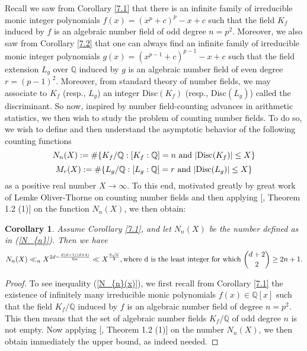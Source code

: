 \documentclass{article}
\theoremstyle{plain}
\newtheorem{cor}[thm]{Corollary}
\theoremstyle{definition}
\begin{document}
Recall we saw from Corollary \ref{7.1} that there is an infinite family of irreducible monic integer polynomials $f(x) = (x^p+c)^p-x+c$ such that the field $K_{f}$ induced by $f$ is an algebraic number field of odd degree $n=p^2$. Moreover, we also saw from Corollary \ref{7.2} that one can always find an infinite family of irreducible monic integer polynomials $g(x) = (x^{p-1}+c)^{p-1}-x+c$ such that the field extension $L_{g}$ over $\mathbb{Q}$ induced by $g$ is an algebraic number field of even degree $r=(p-1)^2$. Moreover, from standard theory of number fields, we may associate to $K_{f}$ (resp., $L_{g}$) an integer Disc$(K_{f})$ (resp., Disc$(L_{g})$) called the discriminant. So now, inspired by number field-counting advances in arithmetic statistics, we then wish to study the problem of counting number fields. To do so, we wish to define and then understand the asymptotic behavior of the following counting functions  
\begin{equation}\label{N_{n}}
N_{n}(X) := \# \{K_{f}\slash \mathbb{Q} : [K_{f} : \mathbb{Q}] = n \textnormal{ and } |\text{Disc}(K_{f})|\leq X \}
\end{equation} 
\begin{equation}\label{M_{r}}
M_{r}(X) := \# \{L_{g}\slash \mathbb{Q} : [L_{g} : \mathbb{Q}] = r \textnormal{ and} \ |\text{Disc}(L_{g})|\leq X \}
\end{equation} as a positive real number $X\to \infty$. To this end, motivated greatly by great work of Lemke Oliver-Thorne \cite{lem} on counting number fields and then applying [\cite{lem}, Theorem 1.2 (1)] on the function $N_{n}(X)$, we then obtain:

\begin{cor} \label{8.1} Assume Corollary \ref{7.1}, and let $N_{n}(X)$ be the number defined as in \textnormal{(\ref{N_{n}})}. Then we have 
\begin{equation}\label{N_{n}(x)} 
N_{n}(X)\ll_{n}X^{2d - \frac{d(d-1)(d+4)}{6n}}\ll X^{\frac{8\sqrt{n}}{3}}, \text{where d is the least integer for which } \binom{d+2}{2}\geq 2n + 1.
\end{equation}
\end{cor}

\begin{proof}
To see inequality \textnormal{(\ref{N_{n}(x)})}, we first recall from Corollary \ref{7.1} the existence of infinitely many irreducible monic polynomials $f(x)\in \mathbb{Q}[x]$ such that the field $K_{f}\slash \mathbb{Q}$ induced by $f$ is an algebraic number field of degree $n=p^2$. This then means that the set of algebraic number fields $K_{f}\slash \mathbb{Q}$  of odd degree $n$ is not empty. Now applying [\cite{lem}, Theorem 1.2 (1)] on the number $N_{n}(X)$, we then obtain immediately the upper bound, as indeed needed.
\end{proof}
\end{document}
